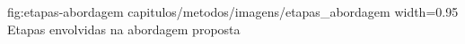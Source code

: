 \figura
{fig:etapas-abordagem}
{capitulos/metodos/imagens/etapas_abordagem}
{width=0.95\textwidth}
{Etapas envolvidas na abordagem proposta}
{}














